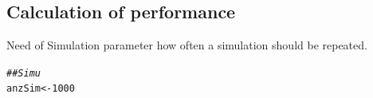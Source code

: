 \documentclass{article}\usepackage[]{graphicx}\usepackage[]{color}
\makeatletter
\newcommand{\hlnum}[1]{\textcolor[rgb]{0.686,0.059,0.569}{#1}}%
\newcommand{\hlcom}[1]{\textcolor[rgb]{0.678,0.584,0.686}{\textit{#1}}}%
\newcommand{\hlstd}[1]{\textcolor[rgb]{0.345,0.345,0.345}{#1}}%
\newcommand{\hlkwb}[1]{\textcolor[rgb]{0.69,0.353,0.396}{#1}}%
\newenvironment{kframe}{%
 \def\at@end@of@kframe{}%
 \ifinner\ifhmode%
  \def\at@end@of@kframe{\end{minipage}}%
  \begin{minipage}{\columnwidth}%
 \fi\fi%
 \def\FrameCommand##1{\hskip\@totalleftmargin \hskip-\fboxsep
 \colorbox{shadecolor}{##1}\hskip-\fboxsep
     \hskip-\linewidth \hskip-\@totalleftmargin \hskip\columnwidth}%
 \MakeFramed {\advance\hsize-\width
   \@totalleftmargin\z@ \linewidth\hsize
   \@setminipage}}%
 {\par\unskip\endMakeFramed%
 \at@end@of@kframe}
\newenvironment{knitrout}{}{} %
\makeatother
\begin{document}
\subsection{Calculation of performance}

Need of Simulation parameter how often a simulation should be repeated.

\begin{knitrout}
\color{fgcolor}\begin{kframe}
\begin{alltt}
\hlcom{##Simu}
\hlstd{anzSim}\hlkwb{<-}\hlnum{1000}
\end{alltt}
\end{kframe}
\end{knitrout}
\end{document}
